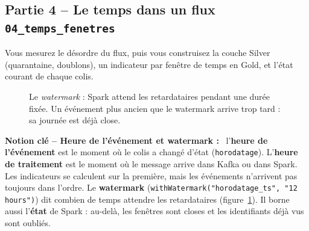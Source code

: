 \documentclass[11pt,a4paper]{article}
\newcommand{\cmd}[1]{\texttt{#1}}
\newenvironment{notion}[1][]{\par\medskip\noindent\textbf{\textcolor{lhblue}{Notion clé\if\relax\detokenize{#1}\relax\else{} -- #1\fi{} :}}\ }{\par\medskip}
\newcommand{\nb}[1]{\textcolor{lhblue}{\texttt{#1}}}
\begin{document}
\subsection*{Partie 4 -- Le temps dans un flux \hfill \nb{04\_temps\_fenetres}}

Vous mesurez le désordre du flux, puis vous construisez la couche Silver (quarantaine, doublons),
un indicateur par fenêtre de temps en Gold, et l'état courant de chaque colis.

\begin{figure}[H]
\centering
{}
\caption{Le \emph{watermark} : Spark attend les retardataires pendant une durée fixée. Un événement
plus ancien que le watermark arrive trop tard : sa journée est déjà close.}
\label{fig:watermark}
\end{figure}

\begin{notion}[Heure de l'événement et watermark]
l'\textbf{heure de l'événement} est le moment où
le colis a changé d'état (\cmd{horodatage}). L'\textbf{heure de traitement} est le moment où le
message arrive dans Kafka ou dans Spark. Les indicateurs se calculent sur la première, mais les
événements n'arrivent pas toujours dans l'ordre. Le \textbf{watermark}
(\cmd{withWatermark("horodatage\_ts", "12 hours")}) dit combien de temps attendre les retardataires
(figure~\ref{fig:watermark}). Il borne aussi l'\textbf{état} de Spark : au-delà, les fenêtres sont
closes et les identifiants déjà vus sont oubliés.
\end{notion}
\end{document}
